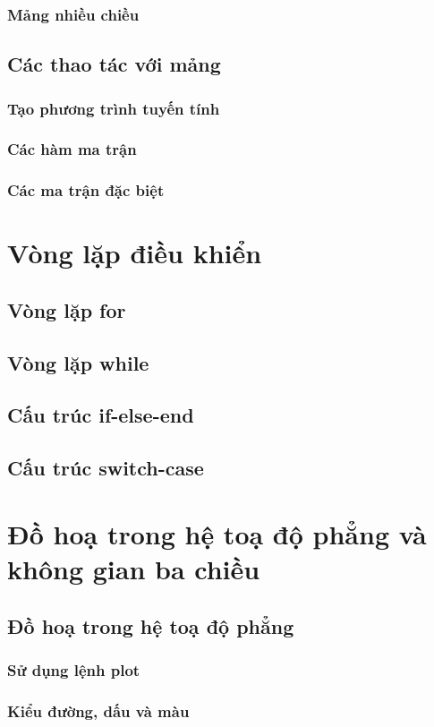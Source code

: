\documentclass[12pt,a4paper]{article}
\begin{document}
\subsubsection{Mảng nhiều chiều}
\subsection{Các thao tác với mảng}
\subsubsection{Tạo phương trình tuyến tính}
\subsubsection{Các hàm ma trận}
\subsubsection{Các ma trận đặc biệt}
\section{Vòng lặp điều khiển}
\subsection{Vòng lặp for}
\subsection{Vòng lặp while}
\subsection{Cấu trúc if-else-end}
\subsection{Cấu trúc switch-case}
\section{Đồ hoạ trong hệ toạ độ phẳng và không gian ba chiều}
\subsection{Đồ hoạ trong hệ toạ độ phẳng}
\subsubsection{Sử dụng lệnh plot}
\subsubsection{Kiểu đường, dấu và màu}
\end{document}
